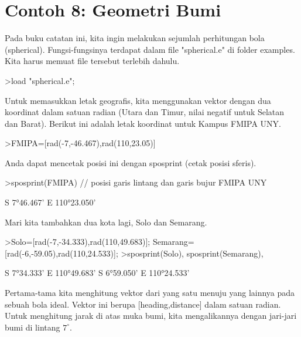 \documentclass[a4paper,11pt,oneside,enabledeprecatedfontcommands]{scrbook}
\newenvironment{eulernotebook}{}{}
\newcommand{\eulerheading}[1]{\chapter{#1}}
\newenvironment{eulercomment}{\par\medskip\noindent}{\par\medskip}
\begin{document}
\begin{eulernotebook}
\eulerheading{Contoh 8: Geometri Bumi}
\begin{eulercomment}
Pada buku catatan ini, kita ingin melakukan sejumlah perhitungan bola (spherical). Fungsi-fungsinya
terdapat dalam file "spherical.e" di folder examples. Kita harus memuat file tersebut terlebih
dahulu.
\end{eulercomment}
\begin{eulerprompt}
>load "spherical.e";
\end{eulerprompt}
\begin{eulercomment}
Untuk memasukkan letak geografis, kita menggunakan vektor dengan dua koordinat dalam satuan radian
(Utara dan Timur, nilai negatif untuk Selatan dan Barat). Berikut ini adalah letak koordinat untuk
Kampus FMIPA UNY.
\end{eulercomment}
\begin{eulerprompt}
>FMIPA=[rad(-7,-46.467),rad(110,23.05)]
\end{eulerprompt}
\begin{euleroutput}
[-0.13569,  1.92657]
\end{euleroutput}
\begin{eulercomment}
Anda dapat mencetak posisi ini dengan sposprint (cetak posisi sferis).
\end{eulercomment}
\begin{eulerprompt}
>sposprint(FMIPA) // posisi garis lintang dan garis bujur FMIPA UNY
\end{eulerprompt}
\begin{euleroutput}
S 7°46.467' E 110°23.050'
\end{euleroutput}
\begin{eulercomment}
Mari kita tambahkan dua kota lagi, Solo dan Semarang.
\end{eulercomment}
\begin{eulerprompt}
>Solo=[rad(-7,-34.333),rad(110,49.683)]; Semarang=[rad(-6,-59.05),rad(110,24.533)];
>sposprint(Solo), sposprint(Semarang),
\end{eulerprompt}
\begin{euleroutput}
S 7°34.333' E 110°49.683'
S 6°59.050' E 110°24.533'
\end{euleroutput}
\begin{eulercomment}
Pertama-tama kita menghitung vektor dari yang satu menuju yang lainnya pada sebuah bola ideal. Vektor
ini berupa [heading,distance] dalam satuan radian. Untuk menghitung jarak di atas muka bumi, kita
mengalikannya dengan jari-jari bumi di lintang $7^\circ$.
\end{eulercomment}

\end{eulernotebook}
\end{document}
